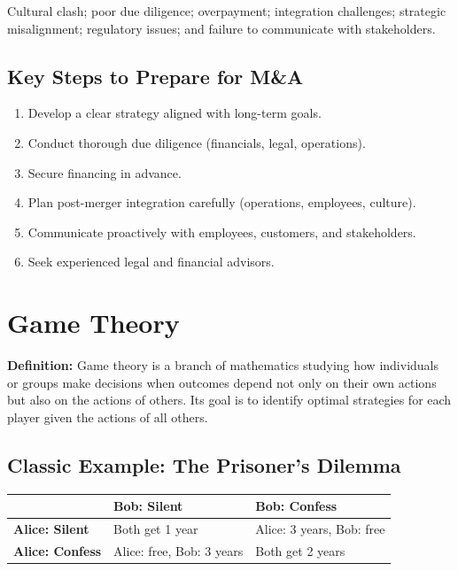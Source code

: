 \documentclass[11pt, letterpaper]{article}
\begin{document}
Cultural clash; poor due diligence; overpayment; integration challenges; strategic misalignment; regulatory issues; and failure to communicate with stakeholders.

\subsection{Key Steps to Prepare for M\&A}

\begin{enumerate}[leftmargin=*, label=\textbf{\arabic*.}]
  \item Develop a clear strategy aligned with long-term goals.
  \item Conduct thorough due diligence (financials, legal, operations).
  \item Secure financing in advance.
  \item Plan post-merger integration carefully (operations, employees, culture).
  \item Communicate proactively with employees, customers, and stakeholders.
  \item Seek experienced legal and financial advisors.
\end{enumerate}

\newpage

\section{Game Theory}

\begin{defbox}
\textbf{Definition:} Game theory is a branch of mathematics studying how individuals or groups make decisions when outcomes depend not only on their own actions but also on the actions of others. Its goal is to identify optimal strategies for each player given the actions of all others.
\end{defbox}

\subsection{Classic Example: The Prisoner's Dilemma}

\begin{center}
\begin{tabular}{p{3cm} p{4cm} p{4cm}}
\toprule
 & \textbf{Bob: Silent} & \textbf{Bob: Confess} \\
\midrule
\textbf{Alice: Silent} & Both get 1 year & Alice: 3 years, Bob: free \\
\textbf{Alice: Confess} & Alice: free, Bob: 3 years & Both get 2 years \\
\bottomrule
\end{tabular}
\end{center}
\end{document}
